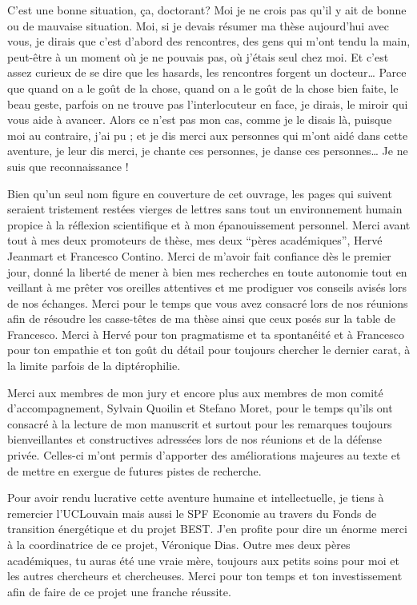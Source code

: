 
C’est une bonne situation, ça, doctorant? Moi je ne crois pas qu’il y ait de bonne ou de mauvaise situation. Moi, si je devais résumer ma thèse aujourd’hui avec vous, je dirais que c’est d’abord des rencontres, des gens qui m’ont tendu la main, peut-être à un moment où je ne pouvais pas, où j’étais seul chez moi. Et c’est assez curieux de se dire que les hasards, les rencontres forgent un docteur… Parce que quand on a le goût de la chose, quand on a le goût de la chose bien faite, le beau geste, parfois on ne trouve pas l’interlocuteur en face, je dirais, le miroir qui vous aide à avancer. Alors ce n’est pas mon cas, comme je le disais là, puisque moi au contraire, j’ai pu ; et je dis merci aux personnes qui m'ont aidé dans cette aventure, je leur dis merci, je chante ces personnes, je danse ces personnes… Je ne suis que reconnaissance ! 

Bien qu'un seul nom figure en couverture de cet ouvrage, les pages qui suivent seraient tristement restées vierges de lettres sans tout un environnement humain propice à la réflexion scientifique et à mon épanouissement personnel. Merci avant tout à mes deux promoteurs de thèse, mes deux ``pères académiques'', Hervé Jeanmart et Francesco Contino. Merci de m'avoir fait confiance dès le premier jour, donné la liberté de mener à bien mes recherches en toute autonomie tout en veillant à me prêter vos oreilles attentives et me prodiguer vos conseils avisés lors de nos échanges. Merci pour le temps que vous avez consacré lors de nos réunions afin de résoudre les casse-têtes de ma thèse ainsi que ceux posés sur la table de Francesco. Merci à Hervé pour ton pragmatisme et ta spontanéité et à Francesco pour ton empathie et ton goût du détail pour toujours chercher le dernier carat, à la limite parfois de la diptérophilie.

Merci aux membres de mon jury et encore plus aux membres de mon comité d'accompagnement, Sylvain Quoilin et Stefano Moret, pour le temps qu'ils ont consacré à la lecture de mon manuscrit et surtout pour les remarques toujours bienveillantes et constructives adressées lors de nos réunions et de la défense privée. Celles-ci m'ont permis d'apporter des améliorations majeures au texte et de mettre en exergue de futures pistes de recherche. 

Pour avoir rendu lucrative cette aventure humaine et intellectuelle, je tiens à remercier l'UCLouvain mais aussi le SPF Economie au travers du Fonds de transition énergétique et du projet BEST. J'en profite pour dire un énorme merci à la coordinatrice de ce projet, Véronique Dias. Outre mes deux pères académiques, tu auras été une vraie mère, toujours aux petits soins pour moi et les autres chercheurs et chercheuses. Merci pour ton temps et ton investissement afin de faire de ce projet une franche réussite.

